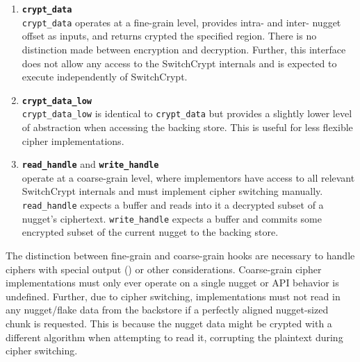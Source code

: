 \begin{enumerate}
   \item \textbf{\texttt{crypt\_data}}\\\texttt{crypt\_data}
   operates at a fine-grain level, provides intra- and inter- nugget offset as
    inputs, and returns crypted the specified region. There is no distinction
    made between encryption and decryption. Further, this interface does not
    allow any access to the SwitchCrypt internals and is expected to execute
    independently of SwitchCrypt. 

   \item \textbf{\texttt{crypt\_data\_low}}\\\texttt{crypt\_data\_low}
   is identical to \texttt{crypt\_data} but provides a slightly lower level of
   abstraction when accessing the backing store. This is useful for less
   flexible cipher implementations.

   \item \textbf{\texttt{read\_handle}} and \textbf{\texttt{write\_handle}}\\
   operate at a coarse-grain level, where implementors have access to all
   relevant SwitchCrypt internals and must implement cipher switching manually.
   \texttt{read\_handle} expects a buffer and reads into it a decrypted subset
   of a nugget's ciphertext. \texttt{write\_handle} expects a buffer
   and commits some encrypted subset of the current nugget to the backing store.
\end{enumerate}

The distinction between fine-grain and coarse-grain hooks are necessary to
handle ciphers with special output () or other considerations. Coarse-grain cipher
implementations must only ever operate on a single nugget or API behavior is
undefined. Further, due to cipher switching, implementations must not read in
any nugget/flake data from the backstore if a perfectly aligned nugget-sized
chunk is requested. This is because the nugget data might be crypted with a
different algorithm when attempting to read it, corrupting the plaintext during
cipher switching.


